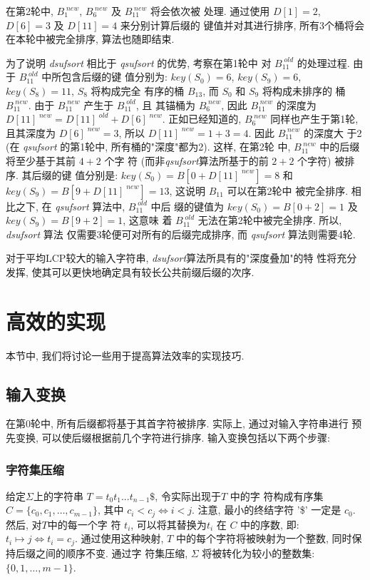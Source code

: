 \documentclass{ws-ijprai}
\begin{document}
在第2轮中, $B_1^{\;new}$, $B_6^{\;new}$ 及 $B_{11}^{\;new}$ 将会依次被
处理. 通过使用 $D[1] = 2$, $D[6] = 3$ 及 $D[11] = 4$ 来分别计算后缀的
键值并对其进行排序, 所有3个桶将会在本轮中被完全排序, 算法也随即结束.

为了说明 \emph{dsufsort} 相比于 \emph{qsufsort} 的优势, 考察在第1轮中
对 $B_{11}^{\;old}$ 的处理过程. 由于 $B_{11}^{\;old}$ 中所包含后缀的键
值分别为: $key(S_0)=6$, $key(S_9)=6$, $key(S_8) = 11$, $S_8$ 将构成完全
有序的桶 $B_{13}$, 而 $S_0$ 和 $S_9$ 将构成未排序的
桶 $B_{11}^{\;new}$. 由于 $B_{11}^{\;new}$ 产生于 $B_{11}^{\;old}$, 且
其锚桶为 $B_6^{\;new}$, 因此 $B_{11}^{\;new}$ 的深度为
$D[11]^{\;new} = D[11]^{\;old} + D[6]^{\;new}$. 正如已经知道的,
$B_6^{\;new}$ 同样也产生于第1轮, 且其深度为 $D[6]^{\;new} =
3$, 所以 $D[11]^{\;new} = 1 + 3 = 4$. 因此 $B_{11}^{\;new}$ 的深度大
于2 (在 \emph{qsufsort} 的第1轮中, 所有桶的"深度"都为2). 这样, 在第2轮
中, $B_{11}^{\;new}$ 中的后缀将至少基于其前 $4+2$ 个字
符 (而非\emph{qsufsort}算法所基于的前 $2+2$ 个字符) 被排序. 其后缀的键
值分别是: $key(S_0)=B[0+D[11] ^{\;new}]=
8$ 和 $key(S_9)=B[9+D[11]^{\;new}]= 13$, 这说明 $B_{11}$ 可以在第2轮中
被完全排序. 相比之下, 在 \emph{qsufsort} 算法中, $B_{11}^{\;old}$ 中后
缀的键值为 $key(S_0) = B[0+2] = 1$ 及 $key(S_9) = B[9+2] = 1$, 这意味
着 $B_{11}^{\;old}$ 无法在第2轮中被完全排序. 所以, \emph{dsufsort} 算法
仅需要3轮便可对所有的后缀完成排序, 而 \emph{qsufsort} 算法则需要4轮.

对于平均LCP较大的输入字符串, \emph{dsufsort}算法所具有的"深度叠加"的特
性将充分发挥, 使其可以更快地确定具有较长公共前缀后缀的次序.


\section{高效的实现}

本节中, 我们将讨论一些用于提高算法效率的实现技巧.

\subsection{输入变换}

在第0轮中, 所有后缀都将基于其首字符被排序. 实际上, 通过对输入字符串进行
预先变换, 可以使后缀根据前几个字符进行排序. 输入变换包括以下两个步骤:

\subsubsection{字符集压缩}

给定$\Sigma$上的字符串 $T = t_0t_1...t_{n-1}\$$, 令实际出现于$T$ 中的字
符构成有序集 $C = \{c_0, c_1,\dots, c_{m-1}\}$, 其中 $c_i < c_j \iff i
< j$. 注意, 最小的终结字符 '\$' 一定是 $c_0$. 然后, 对$T$中的每一个字
符 $t_i$, 可以将其替换为$t_i$ 在 $C$ 中的序数, 即: $t_i \mapsto j \iff
t_i = c_j$. 通过使用这种映射,
$T$ 中的每个字符将被映射为一个整数, 同时保持后缀之间的顺序不变. 通过字
符集压缩, $\Sigma$ 将被转化为较小的整数集: $\{0,1,\dots,m-1\}$.
\end{document}
